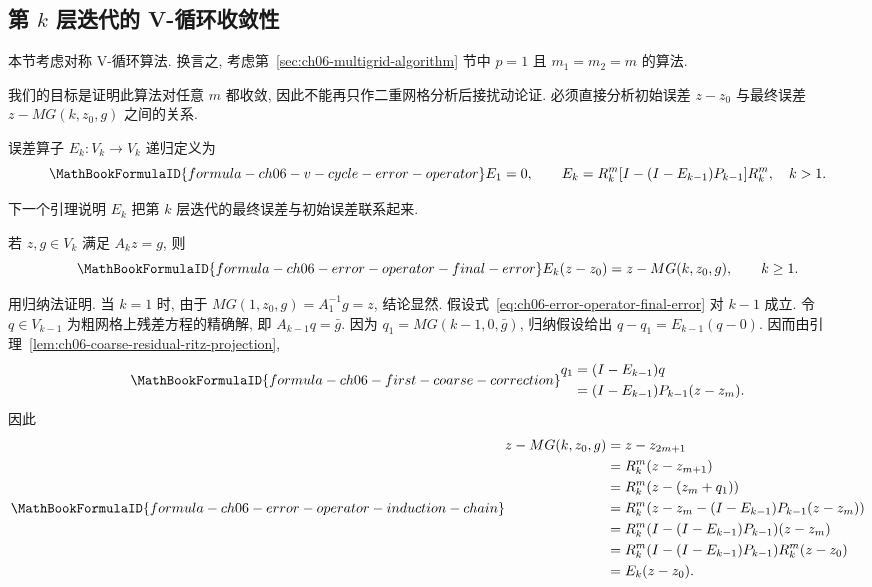\subsection{第 $k$ 层迭代的 V-循环收敛性}
\label{sec:ch06-v-cycle-convergence}
\setcounter{thmcount}{0}
\setcounter{equation}{0}

本节考虑对称 V-循环算法. 换言之, 考虑第~\ref{sec:ch06-multigrid-algorithm} 节中 $p=1$ 且 $m_1=m_2=m$ 的算法.

我们的目标是证明此算法对任意 $m$ 都收敛, 因此不能再只作二重网格分析后接扰动论证. 必须直接分析初始误差 $z-z_0$ 与最终误差 $z-MG(k,z_0,g)$ 之间的关系.

\begin{Definition}
\label{def:ch06-v-cycle-error-operator}
误差算子 $E_k:V_k\longrightarrow V_k$ 递归定义为
\[
\MathBookFormulaID{formula-ch06-v-cycle-error-operator}
E_1=0,
\qquad
E_k=R_k^m[I-(I-E_{k-1})P_{k-1}]R_k^m,
\quad k>1.
\]
\end{Definition}

下一个引理说明 $E_k$ 把第 $k$ 层迭代的最终误差与初始误差联系起来.

\begin{Lemma}
\label{lem:ch06-error-operator-represents-final-error}
若 $z,g\in V_k$ 满足 $A_kz=g$, 则
\begin{equation}
\MathBookFormulaID{formula-ch06-error-operator-final-error}
\label{eq:ch06-error-operator-final-error}
E_k(z-z_0)=z-MG(k,z_0,g),
\qquad k\geq1.
\end{equation}
\end{Lemma}
\begin{Proof}
用归纳法证明. 当 $k=1$ 时, 由于 $MG(1,z_0,g)=A_1^{-1}g=z$, 结论显然. 假设式~\eqref{eq:ch06-error-operator-final-error} 对 $k-1$ 成立. 令 $q\in V_{k-1}$ 为粗网格上残差方程的精确解, 即 $A_{k-1}q=\bar g$. 因为 $q_1=MG(k-1,0,\bar g)$, 归纳假设给出 $q-q_1=E_{k-1}(q-0)$. 因而由引理~\ref{lem:ch06-coarse-residual-ritz-projection},
\begin{equation}
\MathBookFormulaID{formula-ch06-first-coarse-correction}
\label{eq:ch06-first-coarse-correction}
\begin{aligned}
q_1&=(I-E_{k-1})q\\
&=(I-E_{k-1})P_{k-1}(z-z_m).
\end{aligned}
\end{equation}
因此
\[
\MathBookFormulaID{formula-ch06-error-operator-induction-chain}
\begin{aligned}
z-MG(k,z_0,g)
&=z-z_{2m+1}\\
&=R_k^m(z-z_{m+1})\\
&=R_k^m(z-(z_m+q_1))\\
&=R_k^m(z-z_m-(I-E_{k-1})P_{k-1}(z-z_m))\\
&=R_k^m(I-(I-E_{k-1})P_{k-1})(z-z_m)\\
&=R_k^m(I-(I-E_{k-1})P_{k-1})R_k^m(z-z_0)\\
&=E_k(z-z_0).
\end{aligned}
\]
\end{Proof}

